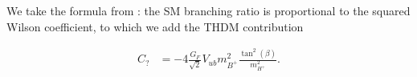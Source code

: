\documentclass[preprint,3p,12pt]{elsarticle}
\newcommand{\HEPfit}{\texttt{HEPfit}\xspace}
\begin{document}
{We take the formula from \cite{Hou:1992sy}: the SM branching ratio is proportional to the squared Wilson coefficient, to which we add the THDM contribution

\begin{align}
 C_? &= -4 \frac{G_F}{\sqrt{2}} V_{ub} m_{B^+}^2 \frac{\tan ^2 (\beta)}{m_{H^+}^2}. \nonumber
\end{align}



}
\end{document}

